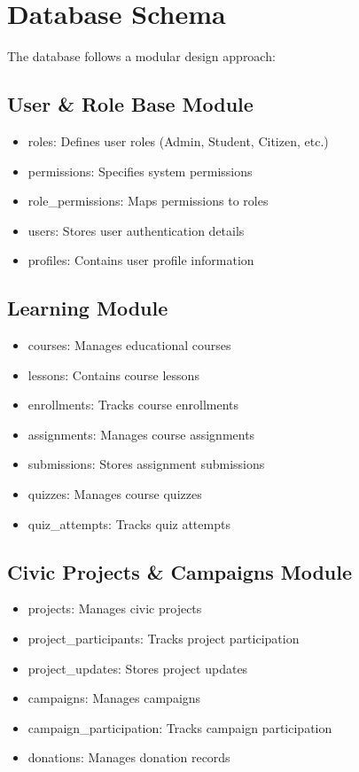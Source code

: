 \documentclass[12pt]{report}
\begin{document}
    \section{Database Schema}
    The database follows a modular design approach:
    
    \subsection{User \& Role Base Module}
    \begin{itemize}
        \item roles: Defines user roles (Admin, Student, Citizen, etc.)
        \item permissions: Specifies system permissions
        \item role\_permissions: Maps permissions to roles
        \item users: Stores user authentication details
        \item profiles: Contains user profile information
    \end{itemize}
    
    \subsection{Learning Module}
    \begin{itemize}
        \item courses: Manages educational courses
        \item lessons: Contains course lessons
        \item enrollments: Tracks course enrollments
        \item assignments: Manages course assignments
        \item submissions: Stores assignment submissions
        \item quizzes: Manages course quizzes
        \item quiz\_attempts: Tracks quiz attempts
    \end{itemize}
    
    \subsection{Civic Projects \& Campaigns Module}
    \begin{itemize}
        \item projects: Manages civic projects
        \item project\_participants: Tracks project participation
        \item project\_updates: Stores project updates
        \item campaigns: Manages campaigns
        \item campaign\_participation: Tracks campaign participation
        \item donations: Manages donation records
    \end{itemize}
    
\end{document}

